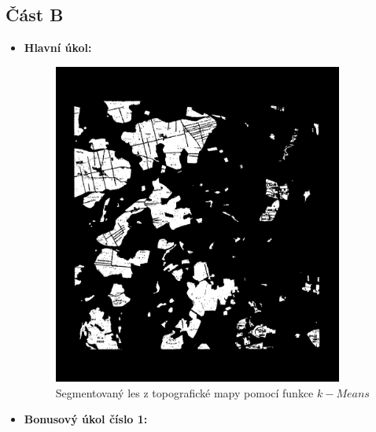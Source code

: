 \subsection*{Část B}
\begin{itemize}
    \item \textbf{Hlavní úkol:}\\
        \begin{figure}[H]
            \centering
            \includegraphics[width=0.9\textwidth]{images/Matlab.jpg}
            \caption{Segmentovaný les z topografické mapy pomocí funkce $k-Means$}
        \end{figure}
        \newpage
    \item \textbf{Bonusový úkol číslo 1:}\\
        \begin{figure}[H]
            \centering

\end{figure}
\end{itemize}
